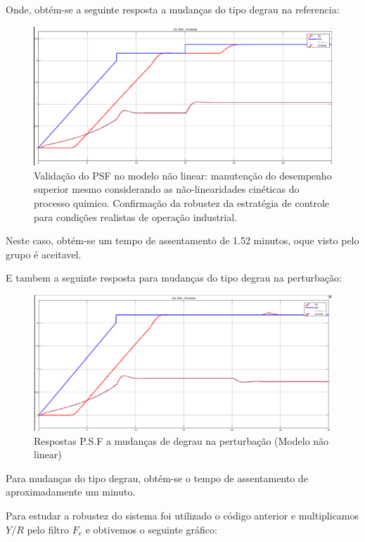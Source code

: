 \documentclass[a4paper,12pt]{article}
\begin{document}
Onde, obtém-se a seguinte resposta a mudanças do tipo degrau na referencia:

\begin{figure} [H]
    \centering
    \includegraphics[width=0.9\linewidth]{image7.png}
    \caption{Validação do PSF no modelo não linear: manutenção do desempenho superior mesmo considerando as não-linearidades cinéticas do processo químico. Confirmação da robustez da estratégia de controle para condições realistas de operação industrial.}
    \label{fig:psf_nonlinear_ref_response}
\end{figure}

Neste caso, obtém-se um tempo de assentamento de 1.52 minutos, oque visto pelo grupo é aceitavel.

E tambem a seguinte resposta para mudanças do tipo degrau na perturbação:

\begin{figure} [H]
    \centering
    \includegraphics[width=0.9\linewidth]{image8.png}
    \caption{Respostas P.S.F a mudanças de degrau na perturbação (Modelo não linear)}
    \label{fig:psf_nonlinear_disturbance_response}
\end{figure}

Para mudanças do tipo degrau, obtém-se o tempo de assentamento de
aproximadamente um minuto.


Para estudar a robustez do sistema foi utilizado o código anterior e multiplicamos $Y/R$ pelo filtro $F_e$ e obtivemos o seguinte gráfico:
\end{document}
